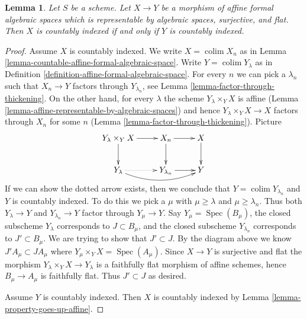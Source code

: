 \documentclass{stacks-project}
\theoremstyle{plain}
\newtheorem{lemma}[subsection]{Lemma}
\theoremstyle{definition}
\theoremstyle{remark}
\numberwithin{equation}{subsection}
\def\colim{\mathop{\mathrm{colim}}\nolimits}
\def\Spec{\mathop{\mathrm{Spec}}}
\begin{document}
\begin{lemma}
\label{lemma-iff-countably-indexed}
Let $S$ be a scheme. Let $X \to Y$ be a morphism of affine
formal algebraic spaces which is representable by algebraic spaces,
surjective, and flat. Then $X$ is countably indexed if and only
if $Y$ is countably indexed.
\end{lemma}

\begin{proof}
Assume $X$ is countably indexed. We write $X = \colim X_n$ as in
Lemma \ref{lemma-countable-affine-formal-algebraic-space}.
Write $Y = \colim Y_\lambda$ as in
Definition \ref{definition-affine-formal-algebraic-space}.
For every $n$ we can pick a $\lambda_n$ such that
$X_n \to Y$ factors through $Y_{\lambda_n}$, see
Lemma \ref{lemma-factor-through-thickening}.
On the other hand, for every $\lambda$ the scheme
$Y_\lambda \times_Y X$ is affine
(Lemma \ref{lemma-affine-representable-by-algebraic-spaces})
and hence $Y_\lambda \times_Y X \to X$ factors through
$X_n$ for some $n$ (Lemma \ref{lemma-factor-through-thickening}).
Picture
$$
\xymatrix{
Y_\lambda \times_Y X \ar[r] \ar[d] & X_n \ar[r] \ar[d] & X \ar[d] \\
Y_\lambda \ar@{..>}[r] \ar@/_1pc/[rr] & Y_{\lambda_n} \ar[r] & Y
}
$$
If we can show the dotted arrow exists, then we conclude that
$Y = \colim Y_{\lambda_n}$ and $Y$ is countably indexed. To do this we
pick a $\mu$ with $\mu \geq \lambda$ and $\mu \geq \lambda_n$.
Thus both $Y_\lambda \to Y$ and $Y_{\lambda_n} \to Y$ factor
through $Y_\mu \to Y$.
Say $Y_\mu = \Spec(B_\mu)$, the closed subscheme $Y_\lambda$ corresponds to
$J \subset B_\mu$, and the closed subscheme $Y_{\lambda_n}$ corresponds to
$J' \subset B_\mu$. We are trying to show that $J' \subset J$.
By the diagram above we know $J'A_\mu \subset JA_\mu$
where $Y_\mu \times_Y X = \Spec(A_\mu)$.
Since $X \to Y$ is surjective and flat the morphism
$Y_\lambda \times_Y X \to Y_\lambda$ is a faithfully flat morphism
of affine schemes, hence $B_\mu \to A_\mu$ is
faithfully flat. Thus $J' \subset J$ as desired.

\medskip\noindent
Assume $Y$ is countably indexed. Then $X$ is countably indexed
by Lemma \ref{lemma-property-goes-up-affine}.
\end{proof}
\end{document}
